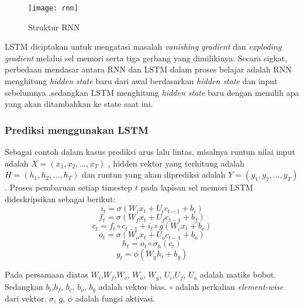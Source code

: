 \documentclass[../thesis.tex]{subfiles}
\begin{document}
\begin{figure}
	\centering
	\texttt{[image: rnn]}
	\caption{Struktur RNN}
	\label{arsi_rnn}
\end{figure}

LSTM diciptakan untuk mengatasi masalah \textit{vanishing gradient} dan \textit{exploding gradient} melalui sel memori serta tiga gerbang yang dimilikinya. Secara sigkat, perbedaan mendasar antara RNN dan LSTM dalam proses belajar adalah  RNN menghitung \textit{hidden state} baru dari awal berdasarkan \textit{hidden state} dan input sebelumnya ,sedangkan LSTM menghitung \textit{hidden state} baru dengan memilih apa yang akan ditambahkan ke state saat ini.


\subsubsection{Prediksi menggunakan LSTM}
Sebagai contoh dalam kasus prediksi arus lalu lintas, misalnya runtun nilai input adalah $X = (x_{1},x_{2},...,x_{T})$ , hidden vektor yang terhitung adalah $H = (h_{1},h_{2},...,h_{T})$ dan runtun yang akan diprediksi adalah $Y = (y_{1},y_{2},...,y_{T})$. 
Proses pembaruan setiap timestep $t$ pada lapisan sel memori LSTM dideskripsikan sebagai berikut:
\begin{equation} \label{input_gate}
 i_{t} = \sigma(W_{i}x_{t} + U_{i}c_{t-1}+b_{i})
\end{equation}
\begin{equation} \label{forget_gate}
	f_{t} = \sigma(W_{f}x_{t} + U_{f}c_{t-1}+b_{f})
\end{equation}
\begin{equation} \label{cell_state}
	c_{t} = f_{t}\circ c_{t-1} + i_{t}\circ g(W_{c}x_{t}+b_{c})
\end{equation}
\begin{equation} \label{output_gate}
	o_{t} = \sigma(W_{o}x_{t} + U_{o}c_{t-1}+b_{o})
\end{equation}
\begin{equation} \label{hidden_state}
	h_{t} = o_{t} \circ \sigma_{h}(c_{t})
\end{equation}
\begin{equation} \label{result_gate}
	y_{t} = \phi(W_{y}h_{t} + b_{y})
\end{equation}

Pada persamaan diatas $W_{i}$,$W_{f}$,$W_{c}$, $W_{o}$, $W_{y}$, $U_{i}$,$U_{f}$, $U_{o}$ adalah matiks bobot. Sedangkan $b_{i}$,$b_{f}$, $b_{c}$, $b_{o}$, $b_{y}$ adalah vektor bias.
$\circ$ adalah perkalian \textit{element-wise} dari vektor. $\sigma$, $g$, $\phi$ adalah fungsi aktivasi.
\end{document}
